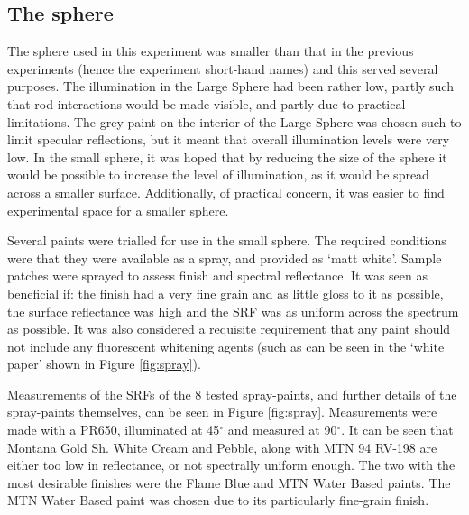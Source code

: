 \subsection{The sphere}



The sphere used in this experiment was smaller than that in the previous experiments (hence the experiment short-hand names) and this served several purposes. The illumination in the Large Sphere had been rather low, partly such that rod interactions would be made visible, and partly due to practical limitations. The grey paint on the interior of the Large Sphere was chosen such to limit specular reflections, but it meant that overall illumination levels were very low. In the small sphere, it was hoped that by reducing the size of the sphere it would be possible to increase the level of illumination, as it would be spread across a smaller surface. Additionally, of practical concern, it was easier to find experimental space for a smaller sphere.

Several paints were trialled for use in the small sphere. The required conditions were that they were available as a spray, and provided as `matt white'. Sample patches were sprayed to assess finish and spectral reflectance. It was seen as beneficial if: the finish had a very fine grain and as little gloss to it as possible, the surface reflectance was high and the \gls{SRF} was as uniform across the spectrum as possible. It was also considered a requisite requirement that any paint should not include any fluorescent whitening agents (such as can be seen in the `white paper' shown in Figure \ref{fig:spray}).

Measurements of the \glspl{SRF} of the 8 tested spray-paints, and further details of the spray-paints themselves, can be seen in Figure \ref{fig:spray}. Measurements were made with a \gls{PR650}, illuminated at 45$^{\circ}$ and measured at 90$^{\circ}$. It can be seen that Montana Gold Sh. White Cream and Pebble, along with MTN 94 RV-198 are either too low in reflectance, or not spectrally uniform enough. The two with the most desirable finishes were the Flame Blue and MTN Water Based paints. The MTN Water Based paint was chosen due to its particularly fine-grain finish.


